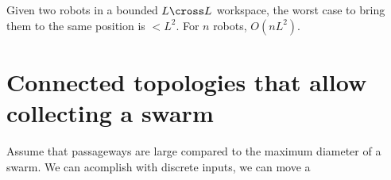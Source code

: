 \documentclass[letterpaper, 10 pt, conference]{ieeeconf}
\begin{document}
  
  Given two robots in a bounded $L \cross L$ workspace, the worst case to bring them to the same position is $< L^2$.  For $n$ robots, $O(n L^2)$.
  
  \section{ Connected topologies that allow collecting a swarm}
  Assume that passageways are large compared to the maximum diameter of a swarm.
  We can acomplish with discrete inputs,
  we can move a 
  
  
  
  
  



    
    
   

%
\end{document}
